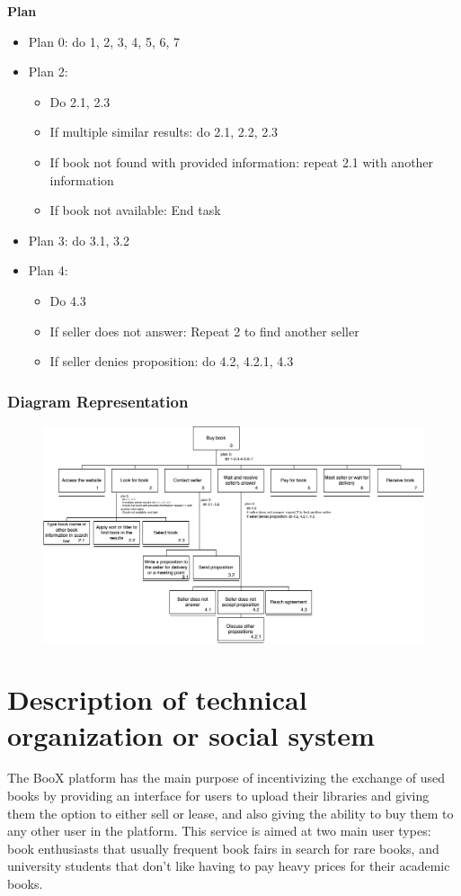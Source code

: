 \documentclass{article}
\begin{document}
\textbf{Plan}
\begin{itemize}
  \item Plan 0: do 1, 2, 3, 4, 5, 6, 7
  \item Plan 2:
  \begin{itemize}
    \item Do 2.1, 2.3
    \item If multiple similar results: do 2.1, 2.2, 2.3
    \item If book not found with provided information: repeat 2.1 with another information
    \item If book not available: End task
  \end{itemize}
  \item Plan 3: do 3.1, 3.2
  \item Plan 4:
  \begin{itemize}
    \item Do 4.3
    \item If seller does not answer: Repeat 2 to find another seller
    \item If seller denies proposition: do 4.2, 4.2.1, 4.3
  \end{itemize}
\end{itemize}

\subsubsection{Diagram Representation}
\begin{figure}[!h]
    \centering
    \includegraphics[width=1.3\textwidth]{img/task-analysis-diagram.png}
    \label{fig:task-diagram}
\end{figure}

\section{Description of technical organization or social system}
The BooX platform has the main purpose of incentivizing the exchange of used books by providing an interface for users to upload their libraries and giving them the option to either sell or lease, and also giving the ability to buy them to any other user in the platform. This service is aimed at two main user types: book enthusiasts that usually frequent book fairs in search for rare books, and university students that don't like having to pay heavy prices for their academic books.
\end{document}
